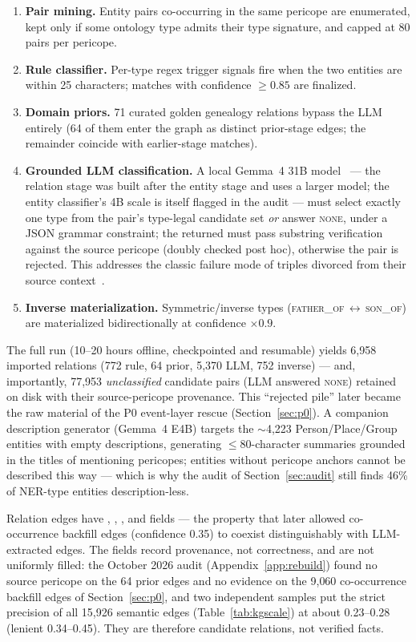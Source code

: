 \begin{enumerate}
\item \textbf{Pair mining.} Entity pairs co-occurring in the same
pericope are enumerated, kept only if some ontology type admits their
type signature, and capped at 80 pairs per pericope.
\item \textbf{Rule classifier.} Per-type regex trigger signals fire when
the two entities are within 25 characters; matches with confidence
$\ge 0.85$ are finalized.
\item \textbf{Domain priors.} 71 curated golden genealogy relations
bypass the LLM entirely (64 of them enter the graph as distinct
prior-stage edges; the remainder coincide with earlier-stage matches).
\item \textbf{Grounded LLM classification.} A local Gemma~4 31B
model~\cite{gemma4} --- the relation stage was built after the entity
stage and uses a larger model; the entity classifier's 4B scale is
itself flagged in the audit --- must select exactly one type from the
pair's type-legal candidate set \emph{or} answer \textsc{none}, under a
JSON grammar constraint; the
returned  must pass substring verification against
the source pericope (doubly checked post hoc), otherwise the pair is
rejected. This addresses the classic failure mode of triples divorced
from their source context~\cite{huang2025tcrqf}.
\item \textbf{Inverse materialization.} Symmetric/inverse types
(\textsc{father\_of}\,$\leftrightarrow$\,\textsc{son\_of}) are
materialized bidirectionally at confidence $\times 0.9$.
\end{enumerate}

The full run (10--20 hours offline, checkpointed and resumable) yields
6{,}958 imported relations (772 rule, 64 prior, 5{,}370 LLM, 752 inverse)
--- and, importantly, 77{,}953 \emph{unclassified} candidate pairs
(LLM answered \textsc{none}) retained on disk with their source-pericope
provenance. This ``rejected pile'' later became the raw material of the
P0 event-layer rescue (Section~\ref{sec:p0}). A companion description
generator (Gemma~4 E4B) targets the $\sim$4{,}223 Person/Place/Group
entities with empty descriptions, generating $\le 80$-character
summaries grounded in the titles of mentioning pericopes; entities
without pericope anchors cannot be described this way --- which is why
the audit of Section~\ref{sec:audit} still finds 46\% of NER-type
entities description-less.

Relation edges have , ,
, and  fields --- the
property that later allowed co-occurrence backfill edges (confidence
0.35) to coexist distinguishably with LLM-extracted edges. The fields
record provenance, not correctness, and are not uniformly filled: the
October 2026 audit (Appendix~\ref{app:rebuild}) found no source pericope
on the 64 prior edges and no evidence on the 9{,}060 co-occurrence
backfill edges of Section~\ref{sec:p0}, and two independent samples put
the strict precision of all 15{,}926 semantic edges
(Table~\ref{tab:kgscale}) at about 0.23--0.28 (lenient 0.34--0.45).
They are therefore candidate relations, not verified facts.


